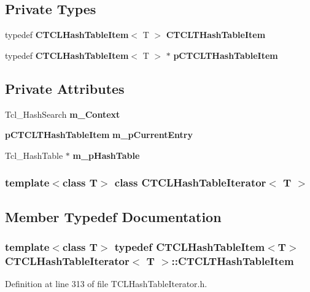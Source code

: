 \subsection*{Private Types}
\begin{CompactItemize}
\item 
typedef {\bf CTCLHash\-Table\-Item}$<$ T $>$ {\bf CTCLTHash\-Table\-Item}
\item 
typedef {\bf CTCLHash\-Table\-Item}$<$ T $>$ $\ast$ {\bf p\-CTCLTHash\-Table\-Item}
\end{CompactItemize}
\subsection*{Private Attributes}
\begin{CompactItemize}
\item 
Tcl\_\-Hash\-Search {\bf m\_\-Context}
\item 
{\bf p\-CTCLTHash\-Table\-Item} {\bf m\_\-p\-Current\-Entry}
\item 
Tcl\_\-Hash\-Table $\ast$ {\bf m\_\-p\-Hash\-Table}
\end{CompactItemize}
\subsubsection*{template$<$class T$>$ class CTCLHash\-Table\-Iterator$<$ T $>$}



\subsection{Member Typedef Documentation}
\subsubsection{\setlength{\rightskip}{0pt plus 5cm}template$<$class T$>$ typedef {\bf CTCLHash\-Table\-Item}$<$T$>$ CTCLHash\-Table\-Iterator$<$ T $>$::CTCLTHash\-Table\-Item\hspace{0.3cm}{\tt  [private]}}\label{classCTCLHashTableIterator_u0}




Definition at line 313 of file TCLHash\-Table\-Iterator.h.
